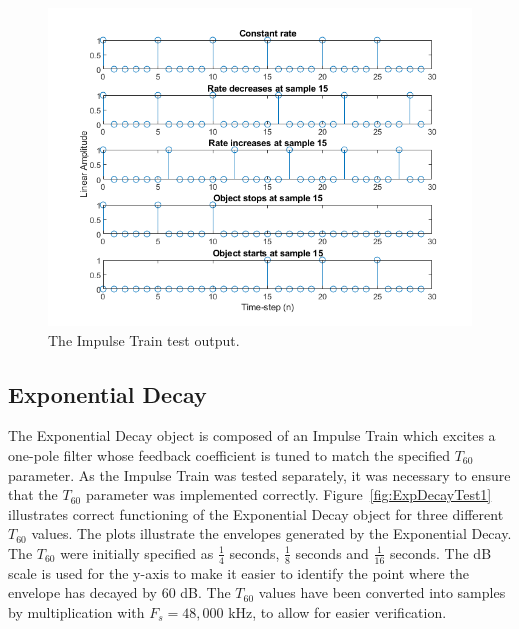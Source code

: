 \documentclass[../main.tex]{subfiles}
\begin{document}
\begin{figure}[h]
    \centering
    \includegraphics[scale=.65]{./images/plots/ImpulseTrainTest.png}
    \caption{The Impulse Train test output.}
    \label{fig:ImpulseTrainTest}
\end{figure}

\subsection{Exponential Decay}
The Exponential Decay object is composed of an Impulse Train which excites a one-pole filter whose feedback coefficient is tuned to match the specified $T_{60}$ parameter. As the Impulse Train was tested separately, it was necessary to ensure that the $T_{60}$ parameter was implemented correctly. Figure~\ref{fig:ExpDecayTest1} illustrates correct functioning of the Exponential Decay object for three different $T_{60}$ values. The plots illustrate the envelopes generated by the Exponential Decay. The $T_{60}$ were initially specified as $\frac{1}{4}$ seconds, $\frac{1}{8}$ seconds and $\frac{1}{16}$ seconds. The dB scale is used for the y-axis to make it easier to identify the point where the envelope has decayed by 60 dB. The $T_{60}$ values have been converted into samples by multiplication with $F_s = 48,000$ kHz, to allow for easier verification.
\end{document}
